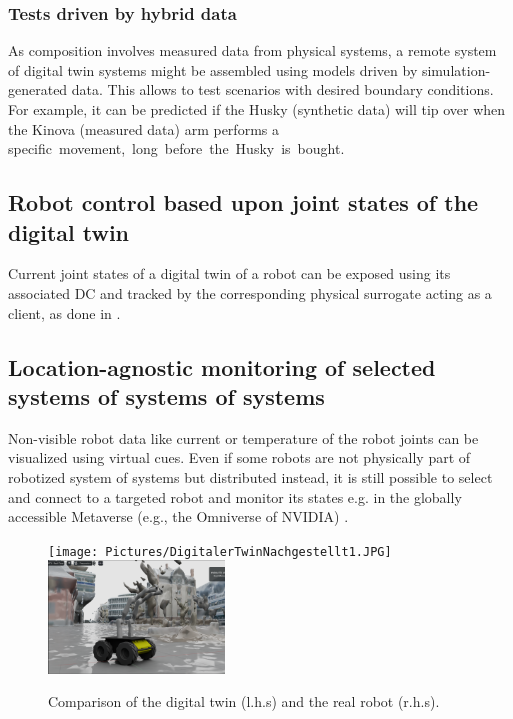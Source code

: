 \documentclass[conference]{IEEEtran}
\begin{document}
\subsubsection{Tests driven by hybrid data}
As composition involves measured data from physical systems, a remote system of digital twin systems might be assembled using models driven by simulation-generated data. This allows to test scenarios with desired boundary conditions. 
For example, it can be predicted if the Husky (synthetic data) will tip over when the Kinova (measured data) arm performs a \mbox{specific movement, long before the Husky is bought.}
\subsection{Robot control based upon joint states of the digital twin}
Current joint states of a digital twin of a robot can be exposed using its associated DC and tracked by the corresponding physical surrogate acting as a client, as done in \cite{kaigom2020value}.
\subsection{Location-agnostic monitoring of selected systems of systems of systems}
Non-visible robot data like  current or temperature of the robot joints can be visualized using virtual cues.
Even if some  robots are not physically part of robotized system of systems but distributed instead, it is still possible to select and connect to a targeted robot and monitor its states  e.g. in the globally accessible Metaverse (e.g., the Omniverse of NVIDIA) \cite{kaigom2023metarobotics}.
\begin{figure}[t]
    \centerline{\texttt{[image: Pictures/DigitalerTwinNachgestellt1.JPG]}\hspace{0.1cm}\includegraphics[height=3cm]{Pictures/DigitalerTwinNachgestellt2.png}}
    \caption{Comparison of the digital twin (l.h.s) and the real robot (r.h.s).}
    \label{fig:CompareDigitalReal}
\end{figure}
\end{document}
